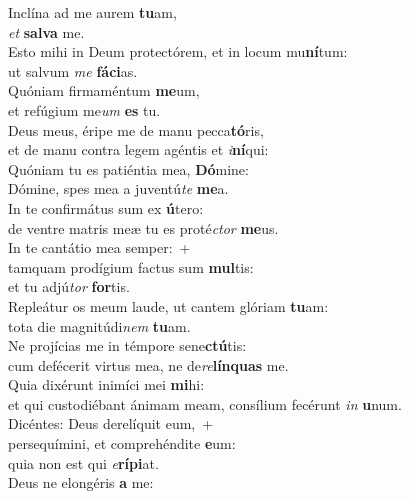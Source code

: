 \evenverse Inclína ad me aurem \textbf{tu}am,~\*\\
\evenverse \textit{et} \textbf{sal}\textbf{va} me.\\
\oddverse Esto mihi in Deum protectórem, et in locum mu\textbf{ní}tum:~\*\\
\oddverse ut salvum \textit{me} \textbf{fá}\textbf{ci}as.\\
\evenverse Quóniam firmaméntum \textbf{me}um,~\*\\
\evenverse et refúgium me\textit{um} \textbf{es} tu.\\
\oddverse Deus meus, éripe me de manu pecca\textbf{tó}ris,~\*\\
\oddverse et de manu contra legem agéntis et \textit{i}\textbf{ní}qui:\\
\evenverse Quóniam tu es patiéntia mea, \textbf{Dó}mine:~\*\\
\evenverse Dómine, spes mea a juventú\textit{te} \textbf{me}a.\\
\oddverse In te confirmátus sum ex \textbf{ú}tero:~\*\\
\oddverse de ventre matris meæ tu es proté\textit{ctor} \textbf{me}us.\\
\evenverse In te cantátio mea semper:~+\\
\evenverse  tamquam prodígium factus sum \textbf{mul}tis:~\*\\
\evenverse et tu adjú\textit{tor} \textbf{for}tis.\\
\oddverse Repleátur os meum laude, ut cantem glóriam \textbf{tu}am:~\*\\
\oddverse tota die magnitúdi\textit{nem} \textbf{tu}am.\\
\evenverse Ne projícias me in témpore sene\textbf{ctú}tis:~\*\\
\evenverse cum defécerit virtus mea, ne de\textit{re}\textbf{lín}\textbf{quas} me.\\
\oddverse Quia dixérunt inimíci mei \textbf{mi}hi:~\*\\
\oddverse et qui custodiébant ánimam meam, consílium fecérunt \textit{in} \textbf{u}num.\\
\evenverse Dicéntes: Deus derelíquit eum,~+\\
\evenverse  persequímini, et comprehéndite \textbf{e}um:~\*\\
\evenverse quia non est qui \textit{e}\textbf{rí}\textbf{pi}at.\\
\oddverse Deus ne elongéris \textbf{a} me:~\*\\

